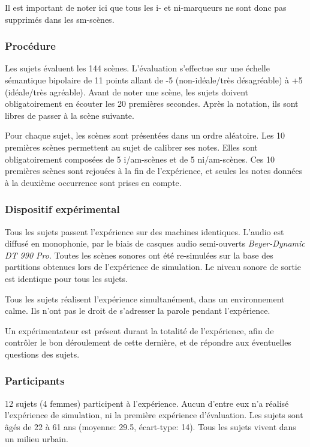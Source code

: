 \documentclass[twoside,twocolumn]{article}
\begin{document}
Il est important de noter ici que tous les i- et ni-marqueurs ne sont donc pas supprimés dans les sm-scènes. 
 
\subsubsection*{Procédure} 

Les sujets évaluent les 144 scènes. L'évaluation s'effectue sur une échelle sémantique bipolaire de 11 points allant de -5 (non-idéale/très désagréable) à +5 (idéale/très agréable). Avant de noter une scène, les sujets doivent obligatoirement en écouter les 20 premières secondes. Après la notation, ils sont libres de passer à la scène suivante.

Pour chaque sujet, les scènes sont présentées dans un ordre aléatoire. Les 10 premières scènes permettent au sujet de calibrer ses notes. Elles sont obligatoirement composées de 5 i/am-scènes et de 5 ni/am-scènes. Ces 10 premières scènes sont rejouées à la fin de l'expérience, et seules les notes données à la deuxième occurrence sont prises en compte. 


\subsubsection*{Dispositif expérimental} 
Tous les sujets passent l'expérience sur des machines identiques. L'audio est diffusé en monophonie, par le biais de casques audio semi-ouverts \emph{Beyer-Dynamic DT 990 Pro}. Toutes les scènes sonores ont été re-simulées sur la base des partitions obtenues lors de l'expérience de simulation. Le niveau sonore de sortie est identique pour tous les sujets.

Tous les sujets réalisent l'expérience simultanément, dans un environnement calme. Ils n'ont pas le droit de s'adresser la parole pendant l'expérience. 

Un expérimentateur est présent durant la totalité de l'expérience, afin de contrôler le bon déroulement de cette dernière, et de répondre aux éventuelles questions des sujets.  

\subsubsection*{Participants} 
12 sujets (4 femmes) participent à l'expérience. Aucun d'entre eux n'a réalisé l'expérience de simulation, ni la première expérience d'évaluation. Les sujets sont âgés de 22 à 61 ans (moyenne: 29.5, écart-type: 14). Tous les sujets vivent dans un milieu urbain.
\end{document}
